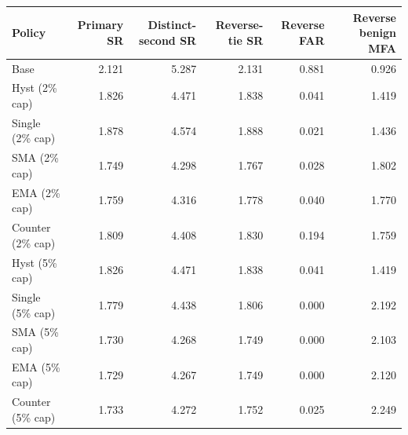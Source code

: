 \begin{suppnonfloattable}
\centering
\caption{Same-second timestamp-tie sensitivity on the frozen UNSW-NB15 source-IP proxy test. Primary SR uses all 761,960 within-proxy adjacent edges. Distinct-second SR excludes the 576,912 equal-second edges but keeps every saved action unchanged. Reverse-tie SR reruns the same fixed policy after reversing event-ID order only within equal-second, same-proxy groups. All values are percentages; this is an exploratory sensitivity, not recovered subsecond chronology.}
\label{tab:supp_ties}
\scriptsize
\setlength{\tabcolsep}{4pt}
\begin{tabular}{lrrrrr}
\toprule
Policy & Primary SR & Distinct-second SR & Reverse-tie SR & Reverse FAR & Reverse benign MFA \\
\midrule
Base & 2.121 & 5.287 & 2.131 & 0.881 & 0.926 \\
Hyst (2\% cap) & 1.826 & 4.471 & 1.838 & 0.041 & 1.419 \\
Single (2\% cap) & 1.878 & 4.574 & 1.888 & 0.021 & 1.436 \\
SMA (2\% cap) & 1.749 & 4.298 & 1.767 & 0.028 & 1.802 \\
EMA (2\% cap) & 1.759 & 4.316 & 1.778 & 0.040 & 1.770 \\
Counter (2\% cap) & 1.809 & 4.408 & 1.830 & 0.194 & 1.759 \\
Hyst (5\% cap) & 1.826 & 4.471 & 1.838 & 0.041 & 1.419 \\
Single (5\% cap) & 1.779 & 4.438 & 1.806 & 0.000 & 2.192 \\
SMA (5\% cap) & 1.730 & 4.268 & 1.749 & 0.000 & 2.103 \\
EMA (5\% cap) & 1.729 & 4.267 & 1.749 & 0.000 & 2.120 \\
Counter (5\% cap) & 1.733 & 4.272 & 1.752 & 0.025 & 2.249 \\
\bottomrule
\end{tabular}
\end{suppnonfloattable}
